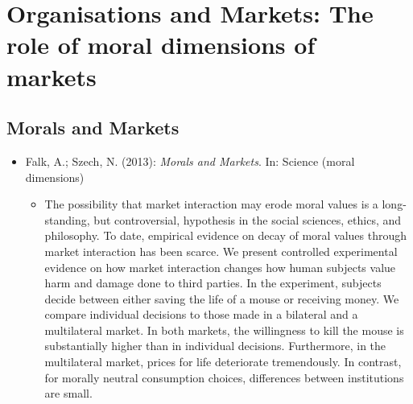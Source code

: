 
\chapter{Organisations and Markets: The role of moral dimensions of markets}


\section{Morals and Markets}
\begin{itemize}
	\item Falk, A.; Szech, N. (2013): \textit{Morals and Markets}. In: Science (moral dimensions)
		\begin{itemize}
			\item The possibility that market interaction may erode moral values is a long-standing, but controversial, hypothesis in the social sciences, ethics, and philosophy. To date, empirical evidence on decay of moral values through market interaction has been scarce. We present controlled experimental evidence on how market interaction changes how human subjects value harm and damage done to third parties. In the experiment, subjects decide between either saving the life of a mouse or receiving money. We compare individual decisions to those made in a bilateral and a multilateral market. In both markets, the willingness to kill the mouse is substantially higher than in individual decisions. Furthermore, in the multilateral market, prices for life deteriorate tremendously. In contrast, for morally neutral consumption choices, differences between institutions are small.
		\end{itemize}
\end{itemize}
		
